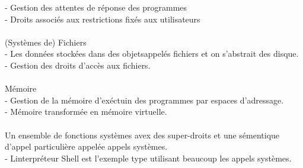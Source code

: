 \documentclass{article}
\begin{document}
    - Gestion des attentes de réponse des programmes \\
    - Droits associés aux restrictions fixés aux utilisateurs \\
    \\
    (Systèmes de) Fichiers \\
    - Les données stockées dans des objetsappelés fichiers et on s'abstrait des disque.\\
    - Gestion des droits d'accès aux fichiers. \\
    \\
    Mémoire  \\
    - Gestion de la mémoire d'exéctuin des programmes par espaces d'adressage. \\
    - Mémoire transformée en mémoire virtuelle. \\
    \\
    Un ensemble de fonctions systèmes avex des super-droits et une sémentique d'appel particulière appelée appels systèmes. \\
    - Linterpréteur Shell est l'exemple type utilisant beaucoup les appels systèmes. 
\end{document}
